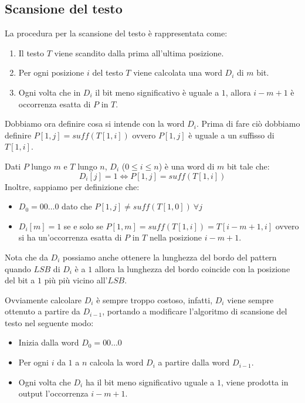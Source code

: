 \subsection{Scansione del testo}
La procedura per la scansione del testo è rappresentata come:
\begin{enumerate}
    \item Il testo $T$ viene scandito dalla prima all'ultima posizione.
    \item Per ogni posizione $i$ del testo $T$ viene calcolata una word $D_i$ di $m$ bit.
    \item Ogni volta che in $D_i$ il bit meno significativo è uguale a $1$, allora
          $i - m + 1$ è occorrenza esatta di $P$ in $T$.
\end{enumerate}
Dobbiamo ora definire cosa si intende con la word $D_i$. Prima di fare ciò dobbiamo
definire $P[1,j] = suff(T[1,i])$ ovvero $P[1,j]$ è uguale a un suffisso di $T[1,i]$.
\begin{definizione}
    Dati $P$ lungo $m$ e $T$ lungo $n$, $D_i$ ($0 \leq i \leq n$) è una word di
    $m$ bit tale che:
    \begin{equation}
        D_i[j] = 1 \iff P[1,j] = suff(T[1,i])
    \end{equation}
    Inoltre, sappiamo per definizione che:
    \begin{itemize}
        \item $D_0 = 00\dots0$ dato che $P[1, j] \neq suff(T[1, 0]) \ \forall j$
        \item $D_i[m] = 1$ se e solo se $P[1, m] = suff(T[1, i]) = T[i-m+1, i]$ ovvero
              si ha un’occorrenza esatta di $P$ in $T$ nella posizione $i - m + 1$.
    \end{itemize}
\end{definizione}
\begin{nota}
    Nota che da $D_i$ possiamo anche ottenere la lunghezza del bordo del pattern
    quando $LSB$ di $D_i$ è a $1$ allora la lunghezza del bordo coincide con la posizione
    del bit a $1$ più più vicino all'$LSB$.
\end{nota}
Ovviamente calcolare $D_i$ è sempre troppo costoso, infatti, $D_i$ viene sempre
ottenuto a partire da $D_{i-1}$, portando a modificare l'algoritmo di scansione
del testo nel seguente modo:
\begin{itemize}
    \item Inizia dalla word $D_0 = 00\dots0$
    \item Per ogni $i$ da $1$ a $n$ calcola la word $D_i$ a partire dalla word $D_{i-1}$.
    \item Ogni volta che $D_i$ ha il bit meno significativo uguale a $1$, viene
          prodotta in output l'occorrenza $i- m + 1$.
\end{itemize}
